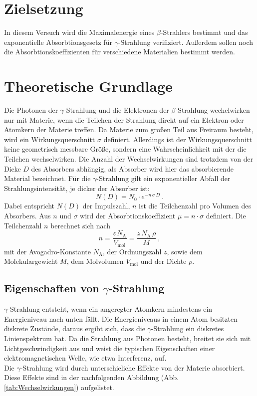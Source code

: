 \section{Zielsetzung}
\label{sec:Zielsetzung}
In diesem Versuch wird die Maximalenergie eines $\beta$-Strahlers bestimmt und das exponentielle Absorbtionsgesetz für $\gamma$-Strahlung verifiziert. Außerdem sollen noch die Absorbtionskoeffizienten für verschiedene Materialien bestimmt werden.

\section{Theoretische Grundlage}
\label{sec:Theorie}
Die Photonen der $\gamma$-Strahlung und die Elektronen der $\beta$-Strahlung wechelwirken nur mit Materie, wenn die Teilchen der Strahlung direkt auf ein Elektron oder Atomkern der Materie treffen. Da Materie zum großen Teil aus Freiraum besteht, wird ein Wirkungsquerschnitt $\sigma$ definiert. Allerdings ist der Wirkungsquerschnitt keine geometrisch messbare Größe, sondern eine Wahrscheinlichkeit mit der die Teilchen wechselwirken. Die Anzahl der Wechselwirkungen sind trotzdem von der Dicke $D$ des Absorbers abhängig, als Absorber wird hier das absorbierende Material bezeichnet. Für die $\gamma$-Strahlung gilt ein exponentieller Abfall der Strahlungsintensität, je dicker der Absorber ist:
\begin{equation}
	N(D) = N_0 \cdot e^{-n\,\sigma\,D} \ .
	\label{eqn:N}
\end{equation}
Dabei entspricht $N(D)$ der Impulszahl, $n$ ist die Teilchenzahl pro Volumen des Absorbers. Aus $n$ und $\sigma$ wird der Absorbtionskoeffizient $\mu = n \cdot \sigma$ definiert. Die Teilchenzahl $n$ berechnet sich nach
\begin{equation}
	n = \frac{z\,N_\text{A}}{V_\text{mol}} = \frac{z\,N_\text{A}\,\rho}{M} \ ,
	\label{eqn:n}
\end{equation}
mit der Avogadro-Konstante $N_\text{A}$, der Ordnungszahl $z$, sowie dem Molekulargewicht $M$, dem Molvolumen $V_\text{mol}$ und der Dichte $\rho$.


\subsection{Eigenschaften von \texorpdfstring{$\gamma$}{}-Strahlung}
$\gamma$-Strahlung entsteht, wenn ein angeregter Atomkern mindestens ein Energieniveau nach unten fällt. Die Energieniveaus in einem Atom besitzten diskrete Zustände, daraus ergibt sich, dass die $\gamma$-Strahlung ein diskretes Linienspektrum hat. Da die Strahlung aus Photonen besteht, breitet sie sich mit Lichtgeschwindigkeit aus und weist die typischen Eigenschaften einer elektromagnetischen Welle, wie etwa Interferenz, auf. \\
Die $\gamma$-Strahlung wird durch unterschieliche Effekte von der Materie absorbiert. Diese Effekte sind in der nachfolgenden Abbildung (Abb. \eqref{tab:Wechselwirkungen}) aufgelistet.

